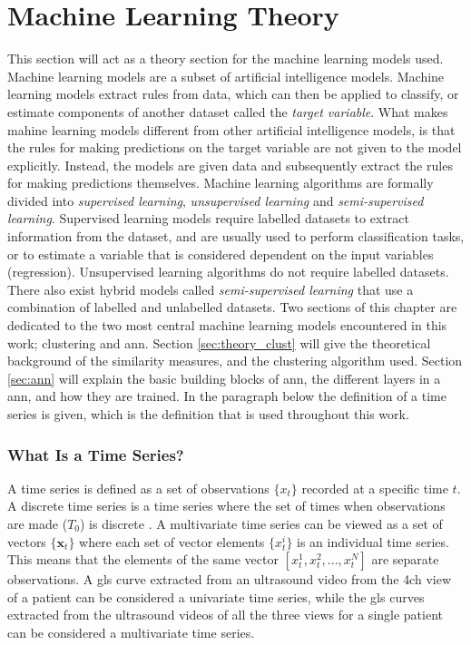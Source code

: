 \chapter{Machine Learning Theory} \label{chap:ml}

This section will act as a theory section for the machine learning models used. Machine learning models are a subset of artificial intelligence models. Machine learning models extract rules from data, which can then be applied to classify, or estimate components of another dataset called the \textit{target variable}. What makes mahine learning models different from other artificial intelligence models, is that the rules for making predictions on the target variable are not given to the model explicitly. Instead, the models are given data and subsequently extract the rules for making predictions themselves. Machine learning algorithms are formally divided into \textit{supervised learning}, \textit{unsupervised learning} and \textit{semi-supervised learning}. Supervised learning models require labelled datasets to extract information from the dataset, and are usually used to perform classification tasks, or to estimate a variable that is considered dependent on the input variables (regression). Unsupervised learning algorithms do not require labelled datasets. There also exist hybrid models called \textit{semi-supervised learning} that use a combination of labelled and unlabelled datasets. Two sections of this chapter are dedicated to the two most central machine learning models encountered in this work; clustering and \acrshort{ann}. Section \ref{sec:theory_clust} will give the theoretical background of the similarity measures, and the clustering algorithm used. Section \ref{sec:ann} will explain the basic building blocks of \acrshort{ann}, the different layers in a \acrshort{ann}, and how they are trained. In the paragraph below the definition of a time series is given, which is the definition that is used throughout this work. \bigskip

\subsection*{What Is a Time Series?}
A time series is defined as a set of observations $\{x_t\}$ recorded at a specific time $t$. A discrete time series is a time series where the set of times when observations are made ($T_0$) is discrete \cite{brockwell_davis_advanced}. A multivariate time series can be viewed as a set of vectors $\{\mathbf{x}_t\}$ where each set of vector elements $\{x^i_t\}$ is an individual time series. This means that the elements of the same vector $[x^1_t, x^2_t,...,x^N_t]$ are separate observations. A \acrshort{gls} curve extracted from an ultrasound video from the \acrshort{4ch} view of a patient can be considered a univariate time series, while the \acrshort{gls} curves extracted from the ultrasound videos of all the three views for a single patient can be considered a multivariate time series. \bigskip

